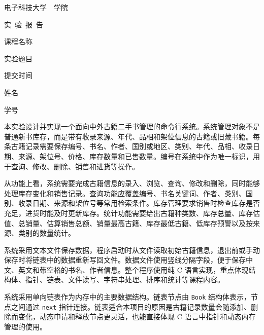 \documentclass[UTF8,a4paper,zihao=5,fontset=fandol]{ctexart}
\newcommand{\sectiontitle}[1]{%
    \vspace{0.7em}
    \noindent{\zihao{-4}\heiti #1}\par
    \vspace{0.25em}
}
\begin{document}
\begin{center}
    \vspace*{0.8cm}
    {\songti 电子科技大学\ \underline{\makebox[3.0cm][c]{}}\ 学院\par}
    \vspace{2.0cm}
    {\heiti 实\ 验\ 报\ 告\par}
    \vspace{1.6cm}
    \begin{minipage}{9.8cm}
        {\heiti
        课程名称\quad \underline{}\par
        实验题目\quad \underline{}\par
        提交时间\quad \underline{\makebox[6.8cm][l]{}}\par
        姓\quad\quad 名\quad \underline{\makebox[6.8cm][l]{}}\par
        学\quad\quad 号\quad \underline{\makebox[6.8cm][l]{}}\par}
    \end{minipage}
\end{center}

\vspace{1.0cm}

\sectiontitle{1、需求分析}

本实验设计并实现一个面向中外古籍二手书管理的命令行系统。系统管理对象不是普通新书库存，而是带有收录来源、年代、品相和架位信息的古籍或旧藏书籍。每条古籍记录需要保存编号、书名、作者、国别或地区、类别、年代、品相、收录日期、来源、架位号、价格、库存数量和已售数量。编号在系统中作为唯一标识，用于查询、修改、删除、销售和进货等操作。

从功能上看，系统需要完成古籍信息的录入、浏览、查询、修改和删除，同时能够处理库存变化和销售记录。查询功能应覆盖编号、书名关键词、作者、类别、国别、收录日期、来源和架位号等常用检索条件。库存管理要求销售时检查库存是否充足，进货时能及时更新库存。统计功能需要给出古籍种类数、库存总量、库存估值、总销量、估算销售总额、销量最高古籍、库存最低古籍、低库存预警以及按来源、类别的数量统计。

系统采用文本文件保存数据，程序启动时从文件读取初始古籍信息，退出前或手动保存时将链表中的数据重新写回文件。数据文件使用竖线分隔字段，便于保存中文、英文和带空格的书名、作者信息。整个程序使用纯 C 语言实现，重点体现结构体、指针、链表、文件读写、字符串处理、排序和统计等课程内容。

\sectiontitle{2、方案设计}

系统采用单向链表作为内存中的主要数据结构。链表节点由 \texttt{Book} 结构体表示，节点之间通过 \texttt{next} 指针连接。链表适合本项目的原因是古籍记录数量会随添加、删除而变化，动态申请和释放节点更灵活，也能直接体现 C 语言中指针和动态内存管理的使用。
\end{document}
